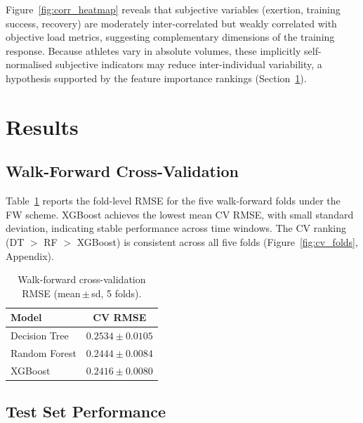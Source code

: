 \documentclass[10pt, twocolumn]{article}
\begin{document}
Figure~\ref{fig:corr_heatmap} reveals that subjective variables
(exertion, training success, recovery) are moderately inter-correlated
but weakly correlated with objective load metrics, suggesting
complementary dimensions of the training response. Because athletes
vary in absolute volumes, these implicitly self-normalised subjective
indicators may reduce inter-individual variability, a hypothesis
supported by the feature importance rankings
(Section~\ref{sec:results}).

\FloatBarrier
\section{Results}
\label{sec:results}

\subsection{Walk-Forward Cross-Validation}

Table~\ref{tab:cv} reports the fold-level RMSE for the five walk-forward
folds under the FW scheme. XGBoost achieves the lowest mean CV RMSE, with
small standard deviation, indicating stable performance across time windows.
The CV ranking (DT $>$ RF $>$ XGBoost) is consistent across all five folds
(Figure~\ref{fig:cv_folds}, Appendix).

\begin{table}[htbp]
  \centering
  \small
  \caption{Walk-forward cross-validation RMSE (mean\,$\pm$\,sd, 5 folds).}
  \label{tab:cv}
  \begin{tabular}{lc}
    \toprule
    Model & CV RMSE \\
    \midrule
    Decision Tree & $0.2534 \pm 0.0105$ \\
    Random Forest & $0.2444 \pm 0.0084$ \\
    XGBoost       & $\mathbf{0.2416 \pm 0.0080}$ \\
    \bottomrule
  \end{tabular}
\end{table}

\subsection{Test Set Performance}
\end{document}
